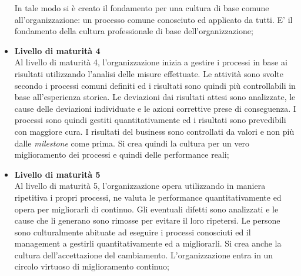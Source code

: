 \begin{itemize}
In tale modo si è creato il fondamento per una cultura di base comune all'organizzazione: un processo comune conosciuto ed applicato da tutti. E' il fondamento della cultura professionale di base dell'organizzazione;
\item \textbf{Livello di maturità 4}\\
Al livello di maturità 4, l'organizzazione inizia a gestire i processi in base ai risultati utilizzando l'analisi delle misure effettuate. Le attività sono svolte secondo i processi comuni definiti ed i risultati sono quindi più controllabili in base all'esperienza storica. Le deviazioni dai risultati attesi sono analizzate, le cause delle deviazioni individuate e le azioni correttive prese di conseguenza.
I processi sono quindi gestiti quantitativamente ed i risultati sono prevedibili con maggiore cura. I risultati del business sono controllati da valori e non più dalle \textit{milestone} come prima. Si crea quindi la cultura per un vero miglioramento dei processi e quindi delle performance reali;
\item \textbf{Livello di maturità 5}\\
Al livello di maturità 5, l'organizzazione opera utilizzando in maniera ripetitiva i propri processi, ne valuta le performance quantitativamente ed opera per migliorarli di continuo. Gli eventuali difetti sono analizzati e le cause che li generano sono rimosse per evitare il loro ripetersi.
Le persone sono culturalmente abituate ad eseguire i processi conosciuti ed il management a gestirli quantitativamente ed a migliorarli. Si crea anche la cultura dell'accettazione del cambiamento. L'organizzazione entra in un circolo virtuoso di miglioramento continuo;
\end{itemize}
